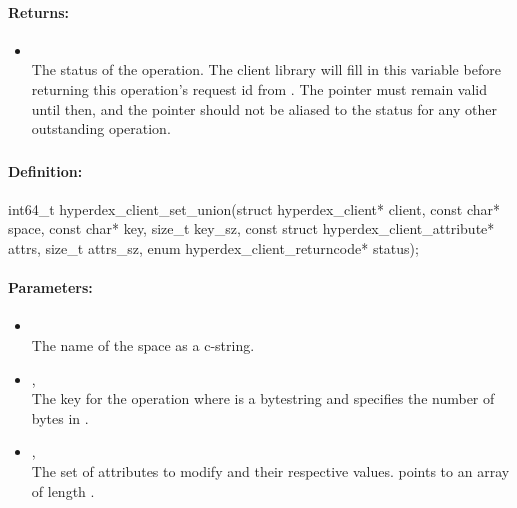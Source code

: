 \paragraph{Returns:}
\begin{itemize}[noitemsep]
\item {}\\
The status of the operation.  The client library will fill in this variable before returning this operation's request id from .  The pointer must remain valid until then, and the pointer should not be aliased to the status for any other outstanding operation.
\end{itemize}

\pagebreak
\subsubsection{}
\label{api:c:set_union}


\paragraph{Definition:}
\begin{ccode}
int64_t hyperdex_client_set_union(struct hyperdex_client* client,
        const char* space,
        const char* key, size_t key_sz,
        const struct hyperdex_client_attribute* attrs, size_t attrs_sz,
        enum hyperdex_client_returncode* status);
\end{ccode}

\paragraph{Parameters:}
\begin{itemize}[noitemsep]
\item {}\\
The name of the space as a c-string.
\item {}, \\
The key for the operation where  is a bytestring and  specifies the number of bytes in .
\item {}, \\
The set of attributes to modify and their respective values.   points to an array of length .
\end{itemize}

